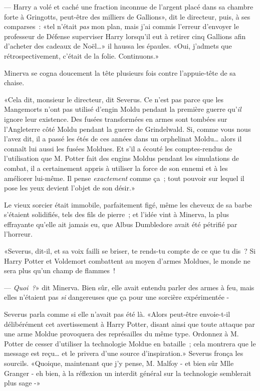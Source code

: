 --- Harry a volé et caché une fraction inconnue de l'argent placé dans sa chambre forte à Gringotts, peut-être des milliers de Gallions», dit le directeur, puis, à ses comparses~: «tel n'était \emph{pas} mon plan, mais j'ai commis l'erreur d'envoyer le professeur de Défense superviser Harry lorsqu'il eut à retirer cinq Gallions afin d'acheter des cadeaux de Noël…» il haussa les épaules. «Oui, j'admets que rétrospectivement, c'était de la folie. Continuons.»

Minerva se cogna doucement la tête plusieurs fois contre l'appuie-tête de sa chaise.

«Cela dit, monsieur le directeur, dit Severus. Ce n'est pas parce que les Mangemorts n'ont pas utilisé d'engin Moldu pendant la première guerre qu'\emph{il} ignore leur existence. Des fusées transformées en armes sont tombées sur l'Angleterre côté Moldu pendant la guerre de Grindelwald. Si, comme vous nous l'avez dit, il a passé les étés de ces années dans un orphelinat Moldu… alors il connaît lui aussi les fusées Moldues. Et s'il a écouté les comptes-rendus de l'utilisation que M. Potter fait des engins Moldus pendant les simulations de combat, il a certainement appris à utiliser la force de son ennemi et à les améliorer lui-même. Il pense \emph{exactement} comme ça~; tout pouvoir sur lequel il pose les yeux devient l'objet de son désir.»

Le vieux sorcier était immobile, parfaitement figé, même les cheveux de sa barbe s'étaient solidifiés, tels des fils de pierre~; et l'idée vint à Minerva, la plus effrayante qu'elle ait jamais eu, que Albus Dumbledore avait été pétrifié par l'horreur.

«Severus, dit-il, et sa voix failli se briser, te rends-tu compte de ce que tu dis~? Si Harry Potter et Voldemort combattent au moyen d'armes Moldues, le monde ne sera plus qu'un champ de flammes~!

--- \emph{Quoi~?}» dit Minerva. Bien sûr, elle avait entendu parler des armes à feu, mais elles n'étaient pas \emph{si} dangereuses que ça pour une sorcière expérimentée -

Severus parla comme si elle n'avait pas été là. «Alors peut-être envoie-t-il délibérément cet avertissement à Harry Potter, disant ainsi que toute attaque par une arme Moldue provoquera des représailles du même type. Ordonnez à M. Potter de cesser d'utiliser la technologie Moldue en bataille~; cela montrera que le message est reçu… et le privera d'une source d'inspiration.» Severus fronça les sourcils. «Quoique, maintenant que j'y pense, M. Malfoy - et bien sûr Mlle Granger - eh bien, à la réflexion un interdit général sur la technologie semblerait plus sage -»

